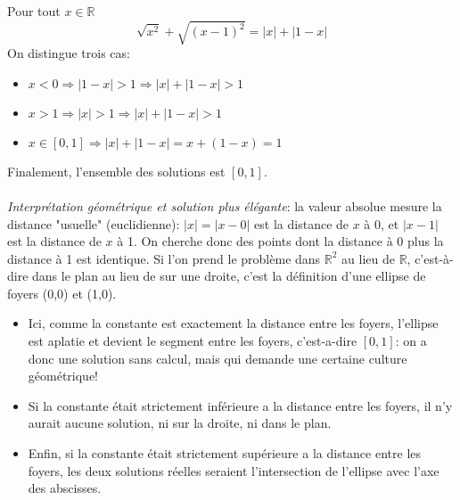 Pour tout $x\in\mathbb{R}$
\[
\sqrt{x^2} + \sqrt{(x-1)^2} = |x|+|1-x|
\]
On distingue trois cas:
\begin{itemize}
  \item $x<0 \Rightarrow |1-x| > 1 \Rightarrow |x|+|1-x| > 1$
  \item $x>1 \Rightarrow |x| > 1 \Rightarrow |x|+|1-x| > 1$
  \item $x\in[0,1]\Rightarrow |x|+|1-x|=x+(1-x)=1$
\end{itemize}
Finalement, l'ensemble des solutions est $[0,1]$.\\ \\

\textit{Interprétation géométrique et solution plus élégante}: la valeur absolue mesure la distance "usuelle" (euclidienne): $|x|=|x-0|$ est la distance de $x$ à 0, et $|x-1|$ est la distance de $x$ à 1. On cherche donc des points dont la distance à 0 plus la distance à 1 est identique. Si l'on prend le problème dans $\mathbb{R}^2$ au lieu de $\mathbb{R}$, c'est-à-dire dans le plan au lieu de sur une droite, c'est la définition d'une ellipse de foyers (0,0) et (1,0).
\begin{itemize}
  \item Ici, comme la constante est exactement la distance entre les foyers, l'ellipse est aplatie et devient le segment entre les foyers, c'est-a-dire $[0,1]$: on a donc une solution sans calcul, mais qui demande une certaine culture géométrique!
  \item Si la constante était strictement inférieure a la distance entre les foyers, il n'y aurait aucune solution, ni sur la droite, ni dans le plan. 
  \item Enfin, si la constante était strictement supérieure a la distance entre les foyers, les deux solutions réelles seraient l'intersection de l'ellipse avec l'axe des abscisses.
  \end{itemize}
